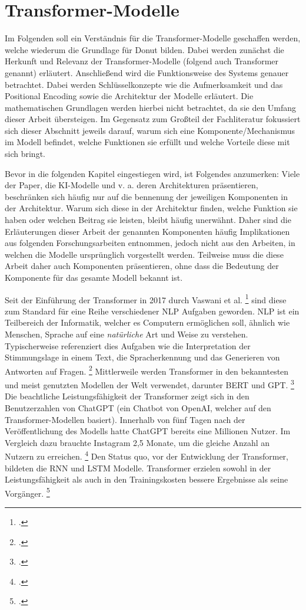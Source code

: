 \section{Transformer-Modelle}
Im Folgenden soll ein Verständnis für die Transformer-Modelle geschaffen werden, welche wiederum die Grundlage für Donut bilden. Dabei werden zunächst die Herkunft und Relevanz der Transformer-Modelle (folgend auch Transformer genannt) erläutert. Anschließend wird die Funktionsweise des Systems genauer betrachtet. Dabei werden Schlüsselkonzepte wie die Aufmerksamkeit und das Positional Encoding sowie die Architektur der Modelle erläutert. Die mathematischen Grundlagen werden hierbei nicht betrachtet, da sie den Umfang dieser Arbeit übersteigen. Im Gegensatz zum Großteil der Fachliteratur fokussiert sich dieser Abschnitt jeweils darauf, warum sich eine Komponente/Mechanismus im Modell befindet, welche Funktionen sie erfüllt und welche Vorteile diese mit sich bringt. 

Bevor in die folgenden Kapitel eingestiegen wird, ist Folgendes anzumerken: Viele der Paper, die KI-Modelle und v. a. deren Architekturen präsentieren, beschränken sich häufig nur auf die bennenung der jeweiligen Komponenten in der Architektur. Warum sich diese in der Architektur finden, welche Funktion sie haben oder welchen Beitrag sie leisten, bleibt häufig unerwähnt. Daher sind die Erläuterungen dieser Arbeit der genannten Komponenten häufig Implikationen aus folgenden Forschungsarbeiten entnommen, jedoch nicht aus den Arbeiten, in welchen die Modelle ursprünglich vorgestellt werden. Teilweise muss die diese Arbeit daher auch Komponenten präsentieren, ohne dass die Bedeutung der Komponente für das gesamte Modell bekannt ist. 

Seit der Einführung der Transformer in 2017 durch Vaswani et al. \footcites{vaswani_attention_2017} sind diese zum Standard für eine Reihe verschiedener \ac{NLP} Aufgaben geworden. \ac{NLP} ist ein Teilbereich der Informatik, welcher es Computern ermöglichen soll, ähnlich wie Menschen, Sprache auf eine \emph{natürliche} Art und Weise zu verstehen. Typischerweise referenziert dies Aufgaben wie die Interpretation der Stimmungslage in einem Text, die Spracherkennung und das Generieren von Antworten auf Fragen. \footcites[Vgl.][S. 1]{beysolow_ii_applied_2018} Mittlerweile werden Transformer in den bekanntesten und meist genutzten Modellen der Welt verwendet, darunter BERT und GPT. \footcites[Vgl.][S. 1]{tunstall_natural_2022} Die beachtliche Leistungsfähigkeit der Transformer zeigt sich in den Benutzerzahlen von ChatGPT (ein Chatbot von OpenAI, welcher auf den Transformer-Modellen basiert). Innerhalb von fünf Tagen nach der Veröffentlichung des Modells hatte ChatGPT bereits eine Millionen Nutzer. Im Vergleich dazu brauchte Instagram 2,5 Monate, um die gleiche Anzahl an Nutzern zu erreichen. \footcites[Vgl.][]{buchholz_infographic_2023} Den Status quo, vor der Entwicklung der Transformer, bildeten die \ac{RNN} und \ac{LSTM} Modelle. Transformer erzielen sowohl in der Leistungsfähigkeit als auch in den Trainingskosten bessere Ergebnisse als seine Vorgänger. \footcites[Vgl.][S. 1]{tunstall_natural_2022}

